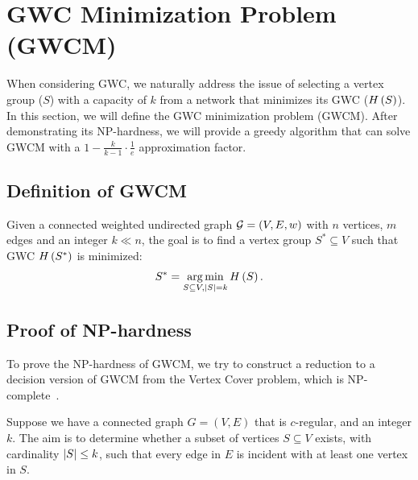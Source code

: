 \documentclass[10pt,twocolumn,twoside]{IEEEtran}
\begin{document}
\section{GWC Minimization Problem (GWCM)}

When considering GWC, we naturally address the issue of selecting a vertex group (\(S\)) with a capacity of \(k\) from a network that minimizes its GWC (\(H\left(S\right)\)).
In this section, we will define the GWC minimization problem (GWCM).
After demonstrating its NP-hardness, we will provide a greedy algorithm that can solve GWCM with a \(1-\frac{k}{k-1}\cdot\frac{1}{e}\) approximation factor.

\subsection{Definition of GWCM}

\begin{problem}
Given a connected weighted undirected graph \(\mathcal{G}=(V,E,w)\) with \(n\) vertices, \(m\) edges and an integer \(k\ll n\), the goal is to find a vertex group \(S^*\subseteq V\) such that GWC \(H\left(S^*\right)\) is minimized:
\begin{equation*}
    S^*=\operatorname*{arg\,min}_{S\subseteq V,\left|S \right|=k}H\left(S\right).
\end{equation*}
\end{problem}

\subsection{Proof of NP-hardness}

To prove the NP-hardness of GWCM, we try to construct a reduction to a decision version of GWCM from the Vertex Cover problem, which is NP-complete~\cite{FrHeJa98}.

\begin{problem}
Suppose we have a connected graph \(G=(V,E)\) that is \(c\)-regular, and an integer \(k\). The aim is to determine whether a subset of vertices \(S\subseteq V\) exists, with cardinality \(\left|S \right|\le k\), such that every edge in \(E\) is incident with at least one vertex in \(S\).
\end{problem}
\end{document}
